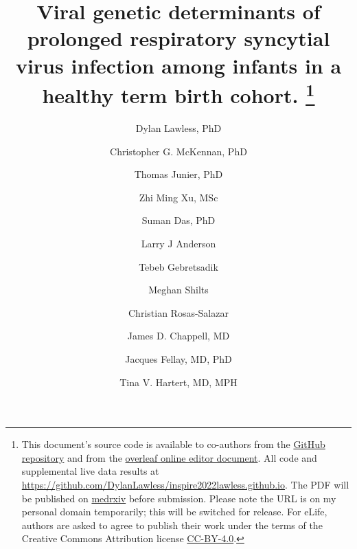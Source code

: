 \documentclass{article} %
\begin{document}
\date{} %
\title{\Large \bf Viral genetic determinants of prolonged respiratory syncytial virus infection among infants in a healthy term birth cohort.
\footnote{This document's source code is available to co-authors from the 
\href{https://github.com/DylanLawless/inspire2022lawless.github.io}{GitHub repository} 
and from the 
\href{https://www.overleaf.com/project/61718a4e077acc3d20ee68f1}{overleaf online editor document}. 
All code and supplemental live data results at \href{https://github.com/DylanLawless/inspire2022lawless.github.io}{https://github.com/DylanLawless/inspire2022lawless.github.io}. 
The PDF will be published on  \href{https://www.medrxiv.org}{medrxiv} 
before submission.
Please note the URL is on my personal domain temporarily; this will be switched for release.
For eLife, authors are asked to agree to publish their work under the terms of the Creative Commons Attribution license
\href{https://creativecommons.org/licenses/by/4.0/}{CC-BY-4.0}.
}
}

\author[epfl]{\rm Dylan Lawless, PhD}
\author[penn]{\rm Christopher G. McKennan, PhD}
\author[sib]{\rm Thomas Junier, PhD}
\author[epfl]{\rm Zhi Ming Xu, MSc}
\author[**]{\rm Suman Das, PhD}
\author[emoryPed]{\rm Larry J Anderson}
\author[bioVan]{\rm  Tebeb Gebretsadik}
\author[**]{\rm Meghan Shilts}
\author[**]{\rm Christian Rosas-Salazar}
\author[pedVan]{\rm James D. Chappell, MD}
\author[epfl]{\rm Jacques Fellay, MD, PhD }
\author[pedVan,medVan]{\rm Tina V. Hartert, MD, MPH}

\maketitle
\end{document}
